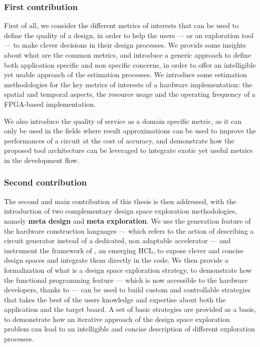 \vspace{-0.1cm}
\subsubsection{First contribution}
First of all, we consider the different metrics of interests that can be used to define the quality of a design, in order to help the users --- or an exploration tool --- to make clever decisions in their design processes.
We provide some insights about what are the common metrics, and introduce a generic approach to define both application specific and non specific concerns, in order to offer an intelligible yet usable approach of the estimation processes.
We introduce some estimation methodologies for the key metrics of interests of a hardware implementation: the spatial and temporal aspects, \ie the resource usage and the operating frequency of a FPGA-based implementation.

We also introduce the quality of service as a domain specific metric, as it can only be used in the fields where result approximations can be used to improve the performances of a circuit at the cost of accuracy, and demonstrate how the proposed tool architecture can be leveraged to integrate exotic yet useful metrics in the development flow.

\subsubsection{Second contribution}
The second and main contribution of this thesis is then addressed, with the introduction of two complementary design space exploration methodologies, namely {\bf meta design} and {\bf meta exploration}.
We use the generation feature of the hardware construction languages --- which refers to the action of describing a circuit generator instead of a dedicated, non adaptable accelerator --- and instrument the framework of \chisel, an emerging HCL, to expose clever and concise design spaces and integrate them directly in the code.
We then provide a formalization of what is a design space exploration strategy, to demonstrate how the functional programming feature --- which is now accessible to the hardware developers, thanks to \chisel{} --- can be used to build custom and controllable strategies that takes the best of the users knowledge and expertise about both the application and the target board.
A set of basic strategies are provided as a basis, to demonstrate how an iterative approach of the design space exploration problem can lead to an intelligible and concise description of different exploration processes.

